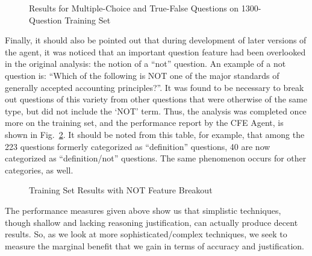 \begin{figure}
\centering
{}
\caption{Results for Multiple-Choice and True-False Questions on 1300-Question Training Set}
\label{fig:version_1_training_set_results}
\end{figure}

Finally, it should also be pointed out that during development of later versions of the agent, it was noticed that an important question feature had been overlooked in the original analysis:  the notion of a ``not'' question.  An example of a not question is:  ``Which of the following is NOT one of the major standards of generally accepted accounting principles?''.  It was found to be necessary to break out questions of this variety from other questions that were otherwise of the same type, but did not include the `NOT' term.  Thus, the analysis was completed once more on the training set, and the performance report by the CFE Agent,  is shown in Fig.~\ref{fig:version_1_training_set_results_not}.  It should be noted from this table, for example, that among the 223 questions formerly  categorized as ``definition'' questions, 40 are now categorized as ``definition/not'' questions.  The same phenomenon occurs for other categories, as well.  

\begin{figure}
\centering
{}
\caption{Training Set Results with NOT Feature Breakout}
\label{fig:version_1_training_set_results_not}
\end{figure}

The performance measures given above show us that simplistic techniques, though shallow and lacking reasoning justification, can actually produce decent results.  So, as we look at more sophisticated/complex techniques, we seek to measure the marginal benefit that we gain in terms of accuracy and justification.



